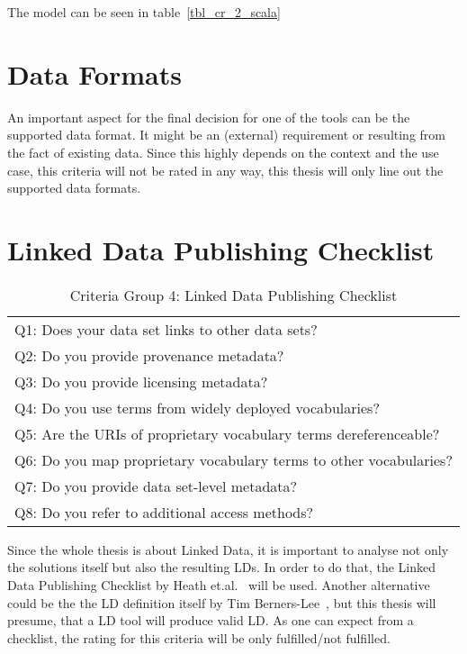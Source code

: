 The model can be seen in table~\ref{tbl_cr_2_scala}

\section{Data Formats}

An important aspect for the final decision for one of the tools can be the supported data format. It might be an (external) requirement or resulting from the fact of existing data. Since this highly depends on the context and the use case, this criteria will not be rated in any way, this thesis will only line out the supported data formats.

\section{Linked Data Publishing Checklist}

\begin{table}[htb]
\centering
\begin{tabular}{|l|}
\rowcolor[HTML]{EFEFEF} 
\hline
\multicolumn{1}{|c|}{\textbf{Criteria}}                        \\ \hline
Q1: Does your data set links to other data sets?                   \\ \hline
Q2: Do you provide provenance metadata?                            \\ \hline
Q3: Do you provide licensing metadata?                             \\ \hline
Q4: Do you use terms from widely deployed vocabularies?            \\ \hline
Q5: Are the URIs of proprietary vocabulary terms dereferenceable?  \\ \hline
Q6: Do you map proprietary vocabulary terms to other vocabularies? \\ \hline
Q7: Do you provide data set-level metadata?                        \\ \hline
Q8: Do you refer to additional access methods?                     \\ \hline
\end{tabular}
\caption{Criteria Group 4: Linked Data Publishing Checklist}
\label{tbl_cr_4_scala}
\end{table}

Since the whole thesis is about Linked Data, it is important to analyse not only the solutions itself but also the resulting LDs. In order to do that, the Linked Data Publishing Checklist by Heath et.al.~\cite{heath2011linked} will be used. Another alternative could be the the LD definition itself by Tim Berners-Lee~\cite{berners2006linked}, but this thesis will presume, that a LD tool will produce valid LD. As one can expect from a checklist, the rating for this criteria will be only fulfilled/not fulfilled.

